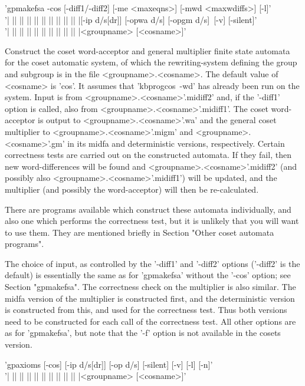 
'gpmakefsa  -cos [-diff1/-diff2] [-me <maxeqns>] [-mwd <maxwdiffs>] [-l]'\\
'| || || || || || || || || || |[-ip d/s[dr]] [-opwa d/s] [-opgm d/s]\
[-v] [-silent]'\\
'| || || || || || || || || || |<groupname> [<cosname>]'

Construct the coset word-acceptor and general multiplier finite state automata
for the coset automatic system, of which the rewriting-system defining
the group and subgroup is in the file <groupname>.<cosname>.
The default value of <cosname> is 'cos'.
It assumes that 'kbprogcos\ -wd' has already been run on the system.
Input is from <groupname>.<cosname>'.midiff2' and, if
the '-diff1' option is called, also from <groupname>.<cosname>'.midiff1'. The
coset word-acceptor is output to <groupname>.<cosname>'.wa' and the general
coset multiplier to <groupname>.<cosname>'.migm' and
<groupname>.<cosname>'.gm' in its midfa and deterministic versions,
respectively.  Certain correctness tests are carried out on the
constructed automata. If they fail, then new word-differences will be
found and <groupname>.<cosname>'.midiff2' (and possibly also
<groupname>.<cosname>'.midiff1')
will be updated, and the multiplier (and possibly the word-acceptor)
will then be re-calculated.

There are programs available which construct these automata individually,
and also one which performs the correctness test, but it is unlikely that
you will want to use them. They are mentioned briefly in
Section "Other coset automata programs".

The choice of input, as controlled by the '-diff1' and '-diff2'
options ('-diff2' is the default) is essentially the same as
for 'gpmakefsa' without the '-cos' option; see Section "gpmakefsa".
The correctness check on the multiplier is also similar. The
midfa version of the multiplier is constructed first, and the
deterministic version is constructed from this, and used for the
correctness test. Thus both versions need to be constructed for
each call of the correctness test.
All other options are as for 'gpmakefsa', but note that the
'-f' option is not available in the cosets version.


'gpaxioms [-cos] [-ip d/s[dr]] [-op d/s] [-silent] [-v] [-l] [-n]'\\
'| || || || || || || || || || |<groupname> [<cosname>]'

